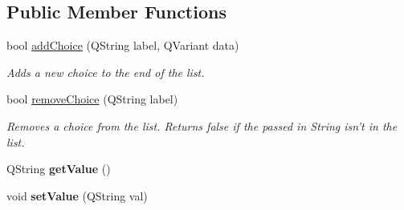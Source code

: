 \subsection*{Public Member Functions}
\begin{DoxyCompactItemize}
\item 
\hypertarget{class_picto_1_1_choice_parameter_a2e6a9124731188b7d0f7228c833a10a8}{bool \hyperlink{class_picto_1_1_choice_parameter_a2e6a9124731188b7d0f7228c833a10a8}{add\-Choice} (Q\-String label, Q\-Variant data)}\label{class_picto_1_1_choice_parameter_a2e6a9124731188b7d0f7228c833a10a8}

\begin{DoxyCompactList}\small\item\em Adds a new choice to the end of the list. \end{DoxyCompactList}\item 
\hypertarget{class_picto_1_1_choice_parameter_ac40d99fb6a447b2e7e32962a13a16507}{bool \hyperlink{class_picto_1_1_choice_parameter_ac40d99fb6a447b2e7e32962a13a16507}{remove\-Choice} (Q\-String label)}\label{class_picto_1_1_choice_parameter_ac40d99fb6a447b2e7e32962a13a16507}

\begin{DoxyCompactList}\small\item\em Removes a choice from the list. Returns false if the passed in String isn't in the list. \end{DoxyCompactList}\item 
\hypertarget{class_picto_1_1_choice_parameter_afb4ca525ecb281497330342a37a5ae40}{Q\-String {\bfseries get\-Value} ()}\label{class_picto_1_1_choice_parameter_afb4ca525ecb281497330342a37a5ae40}

\item 
\hypertarget{class_picto_1_1_choice_parameter_ae4f6cee3ecafe2f85cc25349e5bdfc10}{void {\bfseries set\-Value} (Q\-String val)}\label{class_picto_1_1_choice_parameter_ae4f6cee3ecafe2f85cc25349e5bdfc10}


\end{DoxyCompactItemize}

